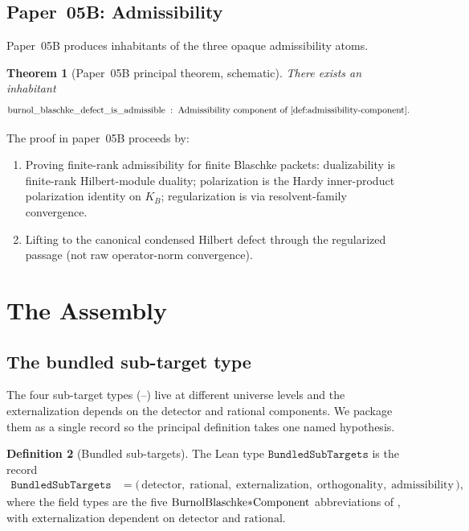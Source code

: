 \documentclass[12pt]{article}
\theoremstyle{plain}
\newtheorem{theorem}{Theorem}[section]
\theoremstyle{definition}
\newtheorem{definition}[theorem]{Definition}
\theoremstyle{remark}
\newcommand{\KB}{K_{B}}
\begin{document}
\subsection{Paper~05B: Admissibility}
\label{sec:paper05b-review}

Paper~05B produces inhabitants of the three opaque admissibility atoms.

\begin{theorem}[Paper~05B principal theorem, schematic]
\label{thm:paper05b}
There exists an inhabitant
\[
  \mathrm{burnol\_blaschke\_defect\_is\_admissible}
  \;:\; \text{Admissibility component of \Cref{def:admissibility-component}}.
\]
\end{theorem}

The proof in paper~05B proceeds by:
\begin{enumerate}
  \item Proving finite-rank admissibility for finite Blaschke packets:
        dualizability is finite-rank Hilbert-module duality;
        polarization is the Hardy inner-product polarization identity
        on \(\KB\); regularization is via resolvent-family convergence.
  \item Lifting to the canonical condensed Hilbert defect through the
        regularized passage (not raw operator-norm convergence).
\end{enumerate}

\section{The Assembly}
\label{sec:assembly}

\subsection{The bundled sub-target type}

The four sub-target types (--) live at different universe levels and the
externalization depends on the detector and rational components.
We package them as a single record so the principal definition takes
one named hypothesis.

\begin{definition}[Bundled sub-targets]
\label{def:bundled-subtargets}
The Lean type \(\mathtt{BundledSubTargets}\) is the record
\begin{align*}
  \mathtt{BundledSubTargets}
    &= \bigl(\,\mathrm{detector},\;\mathrm{rational},\;
              \mathrm{externalization},\;\mathrm{orthogonality},\;
              \mathrm{admissibility}\,\bigr),
\end{align*}
where the field types are the five \(\mathrm{Burnol\-Blaschke\-{*}\-Component}\)
abbreviations of , with
\(\mathrm{externalization}\) dependent on \(\mathrm{detector}\) and
\(\mathrm{rational}\).
\end{definition}
\end{document}
